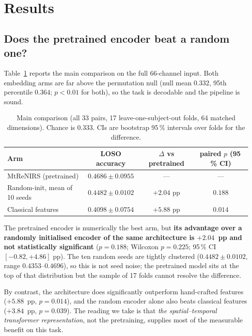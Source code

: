 \section{Results}
\label{sec:results}

\subsection{Does the pretrained encoder beat a random one?}
\label{sec:results_main}

Table~\ref{tab:main} reports the main comparison on the full 66-channel input. Both embedding
arms are far above the permutation null (null mean $0.332$, 95th percentile $0.364$;
$p < 0.01$ for both), so the task is decodable and the pipeline is sound.

\begin{table}[t]
\centering
\caption{Main comparison (all 33 pairs, 17 leave-one-subject-out folds, 64 matched dimensions).
Chance is 0.333. CIs are bootstrap 95\,\% intervals over folds for the difference.}
\label{tab:main}
\begin{tabular}{lccc}
\toprule
Arm & LOSO accuracy & $\Delta$ vs pretrained & paired $p$ (95\,\% CI) \\
\midrule
MtReNIRS (pretrained) & $\mathbf{0.4686 \pm 0.0955}$ & --- & --- \\
Random-init, mean of 10 seeds & $0.4482 \pm 0.0102$ & $+2.04$ pp & $0.188$\;[$-0.82$, $+4.86$] \\
Classical features & $0.4098 \pm 0.0754$ & $+5.88$ pp & $0.014$\;[$+1.86$, $+10.00$] \\
\bottomrule
\end{tabular}
\end{table}

The pretrained encoder is numerically the best arm, but \textbf{its advantage over a randomly
initialised encoder of the same architecture is $+2.04$~pp and not statistically significant}
($p = 0.188$; Wilcoxon $p = 0.225$; 95\,\% CI $[-0.82, +4.86]$ pp). The ten random seeds are
tightly clustered ($0.4482 \pm 0.0102$, range $0.4353$--$0.4696$), so this is not seed noise; the
pretrained model sits at the top of that distribution but the sample of 17 folds cannot resolve
the difference.

By contrast, the architecture does significantly outperform hand-crafted features
($+5.88$~pp, $p = 0.014$), and the random encoder alone also beats classical features
($+3.84$~pp, $p = 0.039$). The reading we take is that \emph{the spatial--temporal transformer
representation}, not the pretraining, supplies most of the measurable benefit on this task.

